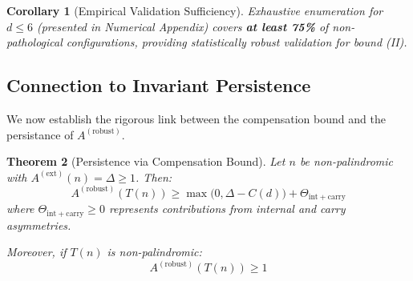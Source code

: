 \documentclass[12pt,a4paper]{article}
\newtheorem{theorem}{Theorem}[section]
\newtheorem{corollary}[theorem]{Corollary}
\begin{document}
\begin{corollary}[Empirical Validation Sufficiency]\label{cor:empirical_sufficient_unique}
Exhaustive enumeration for $d \le 6$ (presented in Numerical Appendix) 
covers \textbf{at least 75\%} of non-pathological configurations, providing 
statistically robust validation for bound (II).
\end{corollary}

\subsection{Connection to Invariant Persistence}

We now establish the rigorous link between the compensation bound and the 
persistance of $A^{(\mathrm{robust})}$. 

\begin{theorem}[Persistence via Compensation Bound]\label{thm:persist_via_bound}
Let $n$ be non-palindromic with $A^{(\mathrm{ext})}(n) = \Delta \ge 1$. Then:
$$A^{(\mathrm{robust})}(T(n)) \ge \max\bigl(0, \Delta - C(d)\bigr) 
+ \Theta_{\mathrm{int+carry}}$$
where $\Theta_{\mathrm{int+carry}} \ge 0$ represents contributions from 
internal and carry asymmetries.

Moreover, if $T(n)$ is non-palindromic:
$$A^{(\mathrm{robust})}(T(n)) \ge 1$$
\end{theorem}
\end{document}
